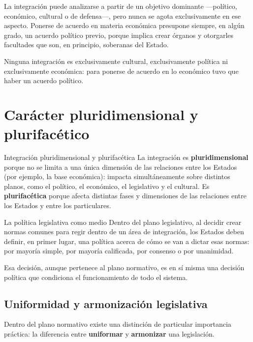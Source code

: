 \documentclass[12pt,oneside]{book}
\begin{document}
La integración puede analizarse a partir de un objetivo dominante —político, económico, cultural o de defensa—, pero nunca se agota exclusivamente en ese aspecto. Ponerse de acuerdo en materia económica presupone siempre, en algún grado, un acuerdo político previo, porque implica crear órganos y otorgarles facultades que son, en principio, soberanas del Estado.

\begin{important}
Ninguna integración es exclusivamente cultural, exclusivamente política ni exclusivamente económica: para ponerse de acuerdo en lo económico tuvo que haber un acuerdo político.
\end{important}

\section{Carácter pluridimensional y plurifacético}

\begin{definition}{Integración pluridimensional y plurifacética}
La integración es \textbf{pluridimensional} porque no se limita a una única dimensión de las relaciones entre los Estados (por ejemplo, la base económica): impacta simultáneamente sobre distintos planos, como el político, el económico, el legislativo y el cultural. Es \textbf{plurifacética} porque afecta distintas fases y dimensiones de las relaciones entre los Estados y entre los particulares.
\end{definition}

\begin{example}{La política legislativa como medio}
Dentro del plano legislativo, al decidir crear normas comunes para regir dentro de un área de integración, los Estados deben definir, en primer lugar, una política acerca de cómo se van a dictar esas normas: por mayoría simple, por mayoría calificada, por consenso o por unanimidad.

Esa decisión, aunque pertenece al plano normativo, es en sí misma una decisión política que condiciona el funcionamiento de todo el sistema.
\end{example}

\subsection{Uniformidad y armonización legislativa}

Dentro del plano normativo existe una distinción de particular importancia práctica: la diferencia entre \textbf{uniformar} y \textbf{armonizar} una legislación.
\end{document}
